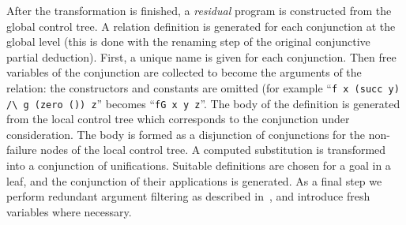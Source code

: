 After the transformation is finished, a \emph{residual} program is constructed from the global control tree. 
A relation definition is generated for each conjunction at the global level (this is done with the renaming step of the original conjunctive partial deduction).
First, a unique name is given for each conjunction. 
Then free variables of the conjunction are collected to become the arguments of the relation: the constructors and constants are omitted (for example ``\lstinline{f x (succ y) /\ g (zero ()) z}'' becomes ``\lstinline{fG x y z}''.
The body of the definition is generated from the local control tree which corresponds to the conjunction under consideration.
The body is formed as a disjunction of conjunctions for the non-failure nodes of the local control tree. 
A computed substitution is transformed into a conjunction of unifications.
Suitable definitions are chosen for a goal in a leaf, and the conjunction of their applications is generated. 
As a final step we perform redundant argument filtering as described in~\cite{leuschel1996redundant}, and introduce fresh variables where necessary.
